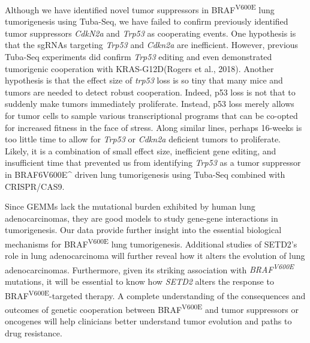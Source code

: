 Although we have identified novel tumor suppressors in BRAF\textsuperscript{V600E} lung tumorigenesis using Tuba-Seq, we have failed to confirm previously identified tumor suppressors \emph{CdkN2a} and \emph{Trp53} as cooperating events.
One hypothesis is that the sgRNAs targeting \emph{Trp53} and \emph{Cdkn2a} are inefficient. However, previous Tuba-Seq experiments did confirm \emph{Trp53} editing and even demonstrated tumorigenic cooperation with KRAS-G12D(Rogers et al., 2018).
Another hypothesis is that the effect size of \emph{trp53} loss is so tiny that many mice and tumors are needed to detect robust cooperation.
Indeed, p53 loss is not that to suddenly make tumors immediately proliferate.
Instead, p53 loss merely allows for tumor cells to sample various transcriptional programs that can be co-opted for increased fitness in the face of stress.
Along similar lines, perhaps 16-weeks is too little time to allow for \emph{Trp53} or \emph{Cdkn2a} deficient tumors to proliferate.
Likely, it is a combination of small effect size, inefficient gene editing, and insufficient time that prevented us from identifying \emph{Trp53} as a tumor suppressor in BRAF6V600E\^{} driven lung tumorigenesis using Tuba-Seq combined with CRISPR/CAS9.

Since GEMMs lack the mutational burden exhibited by human lung adenocarcinomas, they are good models to study gene-gene interactions in tumorigenesis.
Our data provide further insight into the essential biological mechanisms for BRAF\textsuperscript{V600E} lung tumorigenesis.
Additional studies of SETD2's role in lung adenocarcinoma will further reveal how it alters the evolution of lung adenocarcinomas.
Furthermore, given its striking association with \emph{BRAF\textsuperscript{V600E}} mutations, it will be essential to know how \emph{SETD2} alters the response to BRAF\textsuperscript{V600E}-targeted therapy.
A complete understanding of the consequences and outcomes of genetic cooperation between BRAF\textsuperscript{V600E} and tumor suppressors or oncogenes will help clinicians better understand tumor evolution and paths to drug resistance.

